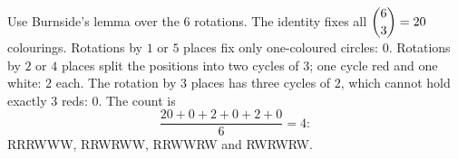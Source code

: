 Use Burnside's lemma over the $6$ rotations. The identity fixes all $\dbinom63=20$ colourings. Rotations by $1$ or $5$ places fix only one-coloured circles: $0$. Rotations by $2$ or $4$ places split the positions into two cycles of $3$; one cycle red and one white: $2$ each. The rotation by $3$ places has three cycles of $2$, which cannot hold exactly $3$ reds: $0$. The count is
\[
\dfrac{20+0+2+0+2+0}{6}=\boxed{4}:
\]
RRRWWW, RRWRWW, RRWWRW and RWRWRW.
